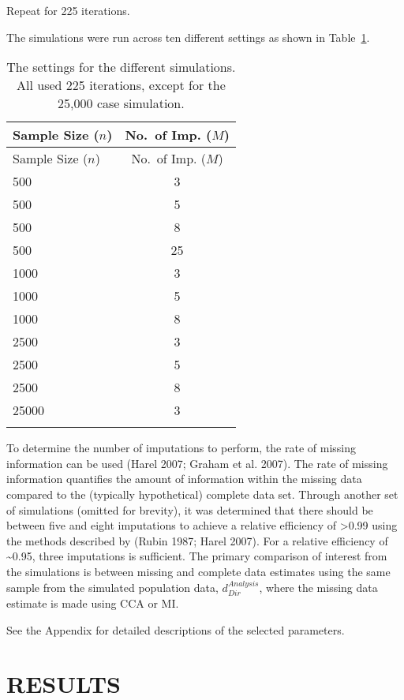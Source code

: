 \documentclass[
  letterpaper,
  DIV=11,
  numbers=noendperiod]{scrartcl}
\begin{document}
Repeat for 225 iterations.

The simulations were run across ten different settings as shown in
Table~\ref{tbl-sim-settings}.

\hypertarget{tbl-sim-settings}{}
\begin{longtable}[]{@{}lc@{}}
\toprule()
Sample Size (\(n\)) & No.~of Imp. (\(M\)) \\
\midrule()
\endfirsthead
\toprule()
Sample Size (\(n\)) & No.~of Imp. (\(M\)) \\
\midrule()
\endhead
500 & 3 \\
500 & 5 \\
500 & 8 \\
500 & 25 \\
1000 & 3 \\
1000 & 5 \\
1000 & 8 \\
2500 & 3 \\
2500 & 5 \\
2500 & 8 \\
25000 & 3 \\
\bottomrule()
\caption{\label{tbl-sim-settings}The settings for the different
simulations. All used 225 iterations, except for the 25,000 case
simulation.}\tabularnewline
\end{longtable}

To determine the number of imputations to perform, the rate of missing
information can be used (Harel 2007; Graham et al. 2007). The rate of
missing information quantifies the amount of information within the
missing data compared to the (typically hypothetical) complete data set.
Through another set of simulations (omitted for brevity), it was
determined that there should be between five and eight imputations to
achieve a relative efficiency of \textgreater0.99 using the methods
described by (Rubin 1987; Harel 2007). For a relative efficiency of
\textasciitilde0.95, three imputations is sufficient. The primary
comparison of interest from the simulations is between missing and
complete data estimates using the same sample from the simulated
population data, \(d_{Dir}^{Analysis}\), where the missing data estimate
is made using CCA or MI.

See the Appendix for detailed descriptions of the selected parameters.

\hypertarget{sec-results}{%
\section{RESULTS}\label{sec-results}}
\end{document}

